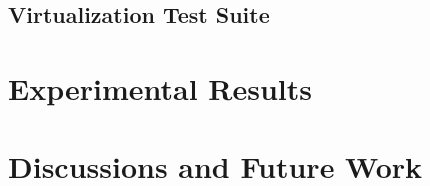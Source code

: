 \documentclass[12pt,onecolumn,oneside]{article}
\begin{document}
\subsection{Virtualization Test Suite}

\newpage


\section{Experimental Results}

\newpage

\section{Discussions and Future Work}

\newpage


\end{document}
